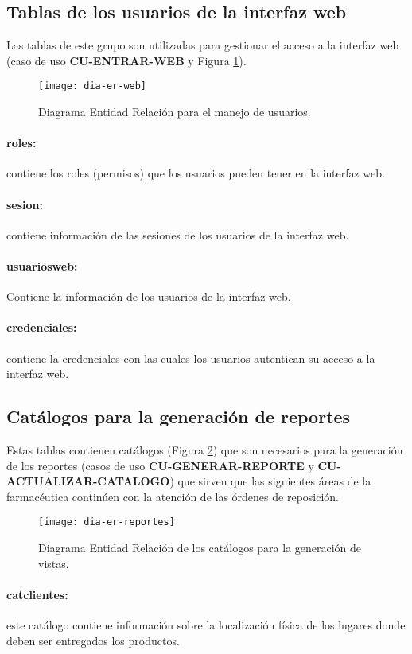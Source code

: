 \subsection{Tablas de los usuarios de la interfaz web}
Las tablas de este grupo son utilizadas para gestionar el acceso a la interfaz web (caso de uso \textbf{CU-ENTRAR-WEB} y Figura \ref{fig:dia-er-web}).
\begin{figure}[h]
  \centering
  \texttt{[image: dia-er-web]} 
  \caption{Diagrama Entidad Relación para el manejo de usuarios.}
  \label{fig:dia-er-web}
\end{figure}
\paragraph{roles:} contiene los roles (permisos) que los usuarios pueden tener en la interfaz web.
\paragraph{sesion:} contiene información de las sesiones de los usuarios de la interfaz web.
\paragraph{usuarios{\textunderscore}web:} Contiene la información de los usuarios de la interfaz web.
\paragraph{credenciales:} contiene la credenciales con las cuales los usuarios autentican su acceso a la interfaz web.


\subsection{Catálogos para la generación de reportes}
Estas tablas contienen catálogos (Figura \ref{fig:dia-er-reportes}) que son necesarios para la generación de los reportes (casos de uso \textbf{CU-GENERAR-REPORTE} y \textbf{CU-ACTUALIZAR-CATALOGO}) que sirven que las siguientes áreas de la farmacéutica continúen con la atención de las órdenes de reposición.
\begin{figure}[h]
  \centering
  \texttt{[image: dia-er-reportes]} 
  \caption{Diagrama Entidad Relación de los catálogos para la generación de vistas.}
  \label{fig:dia-er-reportes}
\end{figure}
\paragraph{cat{\textunderscore}clientes:} este catálogo contiene información sobre la localización física de los lugares donde deben ser entregados los productos.
